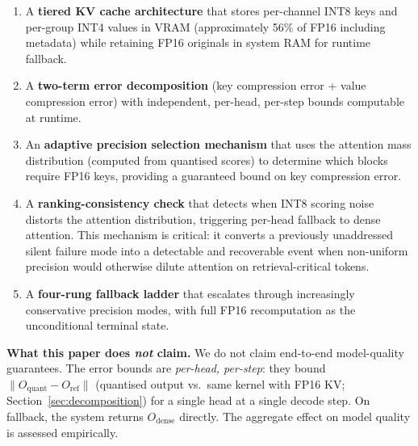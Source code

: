 \documentclass[10pt,twocolumn,a4paper]{article}
\theoremstyle{definition}
\theoremstyle{remark}
\newcommand{\norm}[1]{\lVert #1 \rVert}
\begin{document}
\begin{enumerate}[leftmargin=2em,itemsep=4pt]
  \item A \textbf{tiered KV cache architecture} that stores per-channel INT8 keys and per-group INT4 values in VRAM (approximately 56\% of FP16 including metadata) while retaining FP16 originals in system RAM for runtime fallback.

  \item A \textbf{two-term error decomposition} (key compression error + value compression error) with independent, per-head, per-step bounds computable at runtime.

  \item An \textbf{adaptive precision selection mechanism} that uses the attention mass distribution (computed from quantised scores) to determine which blocks require FP16 keys, providing a guaranteed bound on key compression error.

  \item A \textbf{ranking-consistency check} that detects when INT8 scoring noise distorts the attention distribution, triggering per-head fallback to dense attention.  This mechanism is critical: it converts a previously unaddressed silent failure mode into a detectable and recoverable event when non-uniform precision would otherwise dilute attention on retrieval-critical tokens.

  \item A \textbf{four-rung fallback ladder} that escalates through increasingly conservative precision modes, with full FP16 recomputation as the unconditional terminal state.
\end{enumerate}

\textbf{What this paper does \emph{not} claim.}  We do not claim end-to-end model-quality guarantees.  The error bounds are \emph{per-head, per-step}: they bound $\norm{O_{\mathrm{quant}} - O_{\mathrm{ref}}}$ (quantised output vs.\ same kernel with FP16 KV; Section~\ref{sec:decomposition}) for a single head at a single decode step.  On fallback, the system returns $O_{\mathrm{dense}}$ directly.  The aggregate effect on model quality is assessed empirically.
\end{document}
